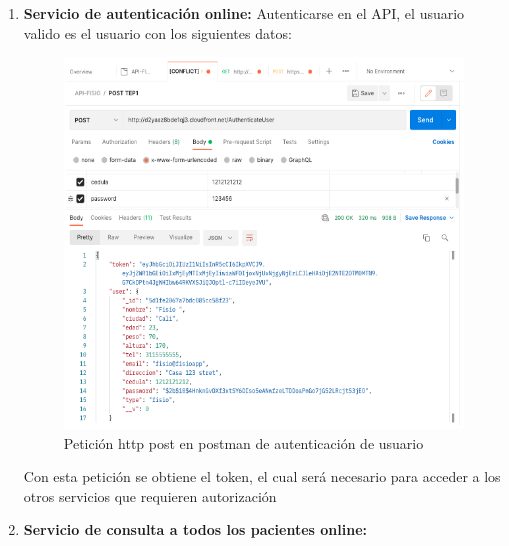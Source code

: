 \documentclass[12pt]{article}
\begin{document}
\begin{enumerate}
    \item \textbf{Servicio de autenticación online:} Autenticarse en el API, el usuario valido es el usuario con los siguientes datos:

            \begin{figure}[ht]
            \centering
            \includegraphics[scale=0.5]{imag/authuseronline2.png}
            \caption{Petición http post en postman de autenticación de usuario }
            \label{6}
            \end{figure}
            \FloatBarrier
    Con esta petición se obtiene el token, el cual será necesario para acceder a los otros servicios que requieren autorización
            
           
            
    \item \textbf{Servicio de consulta a todos los pacientes online:} 
    

\end{enumerate}
\end{document}
